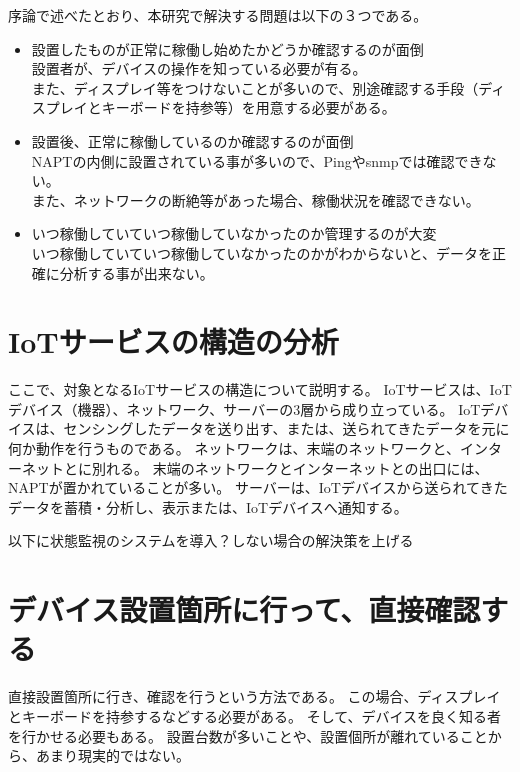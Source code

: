 
序論で述べたとおり、本研究で解決する問題は以下の３つである。
\begin{itemize}
	\item 設置したものが正常に稼働し始めたかどうか確認するのが面倒\\
	設置者が、デバイスの操作を知っている必要が有る。\\
	また、ディスプレイ等をつけないことが多いので、別途確認する手段（ディスプレイとキーボードを持参等）を用意する必要がある。
	\item 設置後、正常に稼働しているのか確認するのが面倒\\
	NAPTの内側に設置されている事が多いので、Pingやsnmpでは確認できない。\\
	また、ネットワークの断絶等があった場合、稼働状況を確認できない。
	\item いつ稼働していていつ稼働していなかったのか管理するのが大変\\
	いつ稼働していていつ稼働していなかったのかがわからないと、データを正確に分析する事が出来ない。
\end{itemize}


\section{IoTサービスの構造の分析}
ここで、対象となるIoTサービスの構造について説明する。
IoTサービスは、IoTデバイス（機器）、ネットワーク、サーバーの3層から成り立っている。
IoTデバイスは、センシングしたデータを送り出す、または、送られてきたデータを元に何か動作を行うものである。
ネットワークは、末端のネットワークと、インターネットとに別れる。
末端のネットワークとインターネットとの出口には、NAPTが置かれていることが多い。
サーバーは、IoTデバイスから送られてきたデータを蓄積・分析し、表示または、IoTデバイスへ通知する。
 

%
%


以下に状態監視のシステムを導入？しない場合の解決策を上げる

\section{デバイス設置箇所に行って、直接確認する}
直接設置箇所に行き、確認を行うという方法である。
この場合、ディスプレイとキーボードを持参するなどする必要がある。
そして、デバイスを良く知る者を行かせる必要もある。
設置台数が多いことや、設置個所が離れていることから、あまり現実的ではない。

